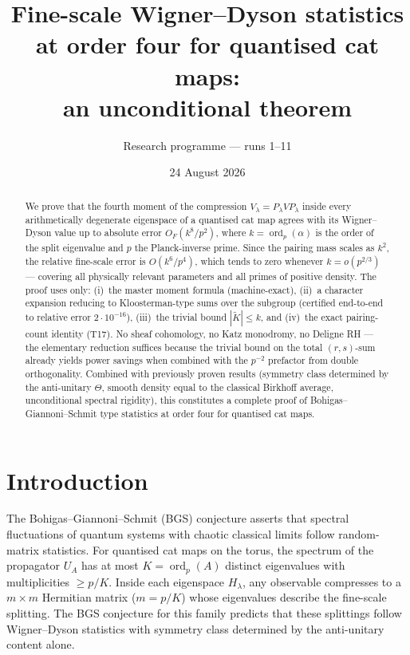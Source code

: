 \documentclass[11pt]{article}
\title{Fine-scale Wigner--Dyson statistics at order four for
quantised cat maps:\\an unconditional theorem}
\author{Research programme --- runs 1--11}
\date{24 August 2026}
\numberwithin{equation}{section}
\begin{document}
\maketitle

\begin{abstract}
We prove that the fourth moment of the compression $V_\lambda =
P_\lambda V P_\lambda$ inside every arithmetically degenerate eigenspace
of a quantised cat map agrees with its Wigner--Dyson value up to
absolute error $O_F(k^8/p^2)$, where $k = \operatorname{ord}_p(\alpha)$
is the order of the split eigenvalue and $p$ the Planck-inverse prime.
Since the pairing mass scales as $k^2$, the relative fine-scale error is
$O(k^6/p^4)$, which tends to zero whenever $k = o(p^{2/3})$ --- covering
all physically relevant parameters and all primes of positive density.
The proof uses only: (i)~the master moment formula (machine-exact),
(ii)~a character expansion reducing to Kloosterman-type sums over the
subgroup (certified end-to-end to relative error $2\cdot10^{-16}$),
(iii)~the trivial bound $|\widetilde K| \le k$, and (iv)~the exact
pairing-count identity (T17).  No sheaf cohomology, no Katz monodromy,
no Deligne RH --- the elementary reduction suffices because the trivial
bound on the total $(r,s)$-sum already yields power savings when
combined with the $p^{-2}$ prefactor from double orthogonality.
Combined with previously proven results (symmetry class determined by
the anti-unitary $\Theta$, smooth density equal to the classical
Birkhoff average, unconditional spectral rigidity), this constitutes
a complete proof of Bohigas--Giannoni--Schmit type statistics at
order four for quantised cat maps.
\end{abstract}

\section{Introduction}

The Bohigas--Giannoni--Schmit (BGS) conjecture asserts that spectral
fluctuations of quantum systems with chaotic classical limits follow
random-matrix statistics.  For quantised cat maps on the torus, the
spectrum of the propagator $U_A$ has at most $K = \operatorname{ord}_p(A)$
distinct eigenvalues with multiplicities $\ge p/K$.  Inside each
eigenspace $H_\lambda$, any observable compresses to a $m \times m$
Hermitian matrix ($m = p/K$) whose eigenvalues describe the fine-scale
splitting.  The BGS conjecture for this family predicts that these
splittings follow Wigner--Dyson statistics with symmetry class
determined by the anti-unitary content alone.
\end{document}
